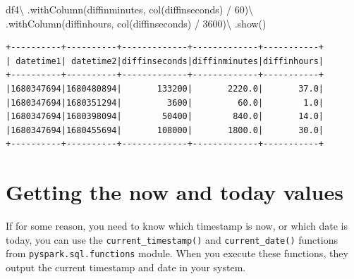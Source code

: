 \documentclass[
  11pt,
  letterpaper,
  DIV=11,
  numbers=noendperiod]{scrreprt}
\newenvironment{Shaded}{\begin{snugshade}}{\end{snugshade}}
\newcommand{\DecValTok}[1]{\textcolor[rgb]{0.68,0.00,0.00}{#1}}
\newcommand{\NormalTok}[1]{\textcolor[rgb]{0.00,0.23,0.31}{#1}}
\newcommand{\OperatorTok}[1]{\textcolor[rgb]{0.37,0.37,0.37}{#1}}
\newcommand{\StringTok}[1]{\textcolor[rgb]{0.13,0.47,0.30}{#1}}
\begin{document}
\begin{Shaded}
\begin{Highlighting}[]
\NormalTok{df4}\OperatorTok{\textbackslash{}}
\NormalTok{    .withColumn(}\StringTok{\textquotesingle{}diffinminutes\textquotesingle{}}\NormalTok{, col(}\StringTok{\textquotesingle{}diffinseconds\textquotesingle{}}\NormalTok{) }\OperatorTok{/} \DecValTok{60}\NormalTok{)}\OperatorTok{\textbackslash{}}
\NormalTok{    .withColumn(}\StringTok{\textquotesingle{}diffinhours\textquotesingle{}}\NormalTok{, col(}\StringTok{\textquotesingle{}diffinseconds\textquotesingle{}}\NormalTok{) }\OperatorTok{/} \DecValTok{3600}\NormalTok{)}\OperatorTok{\textbackslash{}}
\NormalTok{    .show()}
\end{Highlighting}
\end{Shaded}

\begin{verbatim}
+----------+----------+-------------+-------------+-----------+
| datetime1| datetime2|diffinseconds|diffinminutes|diffinhours|
+----------+----------+-------------+-------------+-----------+
|1680347694|1680480894|       133200|       2220.0|       37.0|
|1680347694|1680351294|         3600|         60.0|        1.0|
|1680347694|1680398094|        50400|        840.0|       14.0|
|1680347694|1680455694|       108000|       1800.0|       30.0|
+----------+----------+-------------+-------------+-----------+
\end{verbatim}

\section{Getting the now and today
values}\label{getting-the-now-and-today-values}

If for some reason, you need to know which timestamp is now, or which
date is today, you can use the \texttt{current\_timestamp()} and
\texttt{current\_date()} functions from \texttt{pyspark.sql.functions}
module. When you execute these functions, they output the current
timestamp and date in your system.
\end{document}
